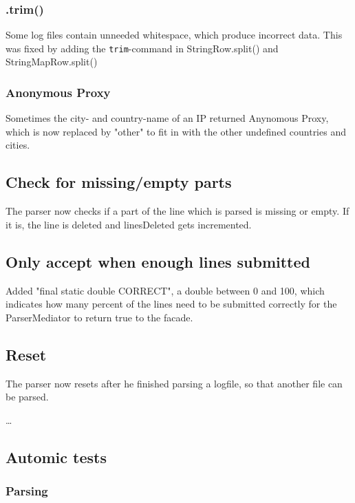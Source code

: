 \subsubsection{.trim()}
Some log files contain unneeded whitespace, which produce incorrect data. 
This was fixed by adding the \texttt{trim}-command in StringRow.split() and StringMapRow.split()

\subsubsection{Anonymous Proxy}
Sometimes the city- and country-name of an IP returned Anynomous Proxy, which is now replaced by "other" to fit in with 
the other undefined countries and cities.

\subsection{Check for missing/empty parts}
The parser now checks if a part of the line which is parsed is missing or empty. If it is, the line is deleted and 
linesDeleted gets incremented.

\subsection{Only accept when enough lines submitted}
Added "final static double CORRECT", a double between 0 and 100, which indicates how many percent of the lines need to be
submitted correctly for the ParserMediator to return true to the facade.

\subsection{Reset}
The parser now resets after he finished parsing a logfile, so that another file can be parsed.

\ldots 
\subsection{Automic tests}

\subsubsection{Parsing}

